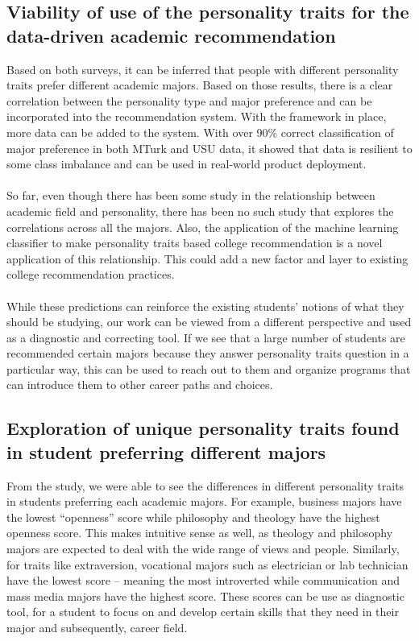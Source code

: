 \documentclass[conference]{IEEEtran}
\begin{document}
\subsection{Viability of use of the personality traits for the data-driven academic
recommendation} \label{subsubsec5}

Based on both surveys, it can be inferred that people with different personality
traits prefer different academic majors. Based on those results, there is a clear
correlation between the personality type and major preference and can be incorporated
into the recommendation system. With the framework in place, more data can be added
to the system. With over 90\% correct classification of
major preference in both MTurk and USU data, it showed that data is resilient to some
class imbalance and can be used in real-world product deployment. \\ \\
So far, even though there has been some study in the relationship between academic
field and personality, there has been no such study that explores the correlations across
all the majors. Also, the application of the machine learning classifier to make
personality traits based college recommendation is a novel application of this
relationship. This could add a new factor and layer to existing college recommendation
practices. \\ \\
While these predictions can reinforce the existing students’ notions of what they should
be studying, our work can be viewed from a different perspective and used as a
diagnostic and correcting tool. If we see that a large number of students are
recommended certain majors because they answer personality traits question in a
particular way, this can be used to reach out to them and organize programs that can
introduce them to other career paths and choices.

\subsection{Exploration of unique personality traits found in student preferring different
majors} \label{subsubsec5}

From the study, we were able to see the differences in different personality traits
in students preferring each academic majors. For example, business majors have the
lowest “openness” score while philosophy and theology have the highest openness
score. This makes intuitive sense as well, as theology and philosophy majors are
expected to deal with the wide range of views and people. Similarly, for traits like
extraversion, vocational majors such as electrician or lab technician have the lowest
score – meaning the most introverted while communication and mass media majors
have the highest score. These scores can be use as diagnostic tool, for a student to focus
on and develop certain skills that they need in their major and subsequently, career
field.
\end{document}
